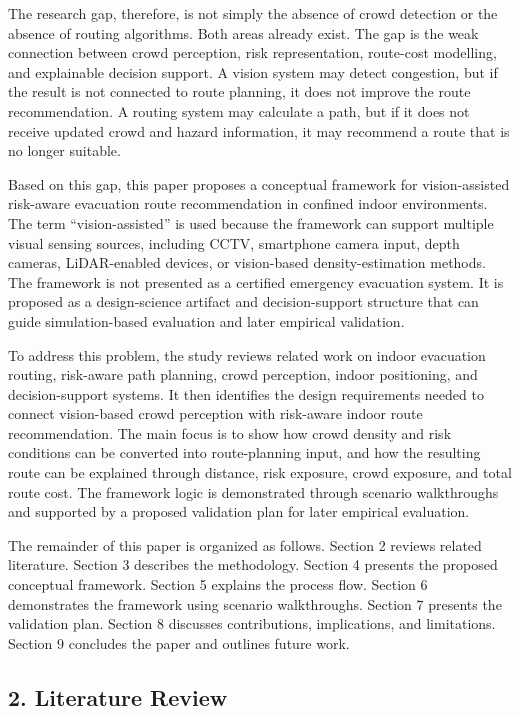 \documentclass[
]{article}
\begin{document}
The research gap, therefore, is not simply the absence of crowd
detection or the absence of routing algorithms. Both areas already
exist. The gap is the weak connection between crowd perception, risk
representation, route-cost modelling, and explainable decision support.
A vision system may detect congestion, but if the result is not
connected to route planning, it does not improve the route
recommendation. A routing system may calculate a path, but if it does
not receive updated crowd and hazard information, it may recommend a
route that is no longer suitable.

Based on this gap, this paper proposes a conceptual framework for
vision-assisted risk-aware evacuation route recommendation in confined
indoor environments. The term ``vision-assisted'' is used because the
framework can support multiple visual sensing sources, including CCTV,
smartphone camera input, depth cameras, LiDAR-enabled devices, or
vision-based density-estimation methods. The framework is not presented
as a certified emergency evacuation system. It is proposed as a
design-science artifact and decision-support structure that can guide
simulation-based evaluation and later empirical validation.

To address this problem, the study reviews related work on indoor
evacuation routing, risk-aware path planning, crowd perception, indoor
positioning, and decision-support systems. It then identifies the design
requirements needed to connect vision-based crowd perception with
risk-aware indoor route recommendation. The main focus is to show how
crowd density and risk conditions can be converted into route-planning
input, and how the resulting route can be explained through distance,
risk exposure, crowd exposure, and total route cost. The framework logic
is demonstrated through scenario walkthroughs and supported by a
proposed validation plan for later empirical evaluation.

The remainder of this paper is organized as follows. Section 2 reviews
related literature. Section 3 describes the methodology. Section 4
presents the proposed conceptual framework. Section 5 explains the
process flow. Section 6 demonstrates the framework using scenario
walkthroughs. Section 7 presents the validation plan. Section 8
discusses contributions, implications, and limitations. Section 9
concludes the paper and outlines future work.

\subsection{2. Literature Review}\label{literature-review}
\end{document}
